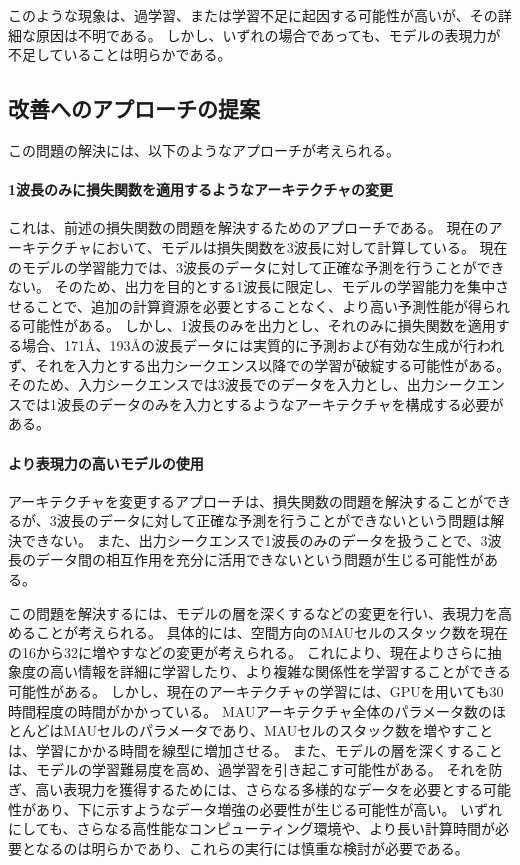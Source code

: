     このような現象は、過学習、または学習不足に起因する可能性が高いが、その詳細な原因は不明である。
    しかし、いずれの場合であっても、モデルの表現力が不足していることは明らかである。
    
    \subsection{改善へのアプローチの提案}
      この問題の解決には、以下のようなアプローチが考えられる。
        \paragraph{1波長のみに損失関数を適用するようなアーキテクチャの変更}
          これは、前述の損失関数の問題を解決するためのアプローチである。
          現在のアーキテクチャにおいて、モデルは損失関数を3波長に対して計算している。
          現在のモデルの学習能力では、3波長のデータに対して正確な予測を行うことができない。
          そのため、出力を目的とする1波長に限定し、モデルの学習能力を集中させることで、追加の計算資源を必要とすることなく、より高い予測性能が得られる可能性がある。
          しかし、1波長のみを出力とし、それのみに損失関数を適用する場合、171Å、193Åの波長データには実質的に予測および有効な生成が行われず、それを入力とする出力シークエンス以降での学習が破綻する可能性がある。
          そのため、入力シークエンスでは3波長でのデータを入力とし、出力シークエンスでは1波長のデータのみを入力とするようなアーキテクチャを構成する必要がある。

        \paragraph{より表現力の高いモデルの使用}
          アーキテクチャを変更するアプローチは、損失関数の問題を解決することができるが、3波長のデータに対して正確な予測を行うことができないという問題は解決できない。
          また、出力シークエンスで1波長のみのデータを扱うことで、3波長のデータ間の相互作用を充分に活用できないという問題が生じる可能性がある。
          
          この問題を解決するには、モデルの層を深くするなどの変更を行い、表現力を高めることが考えられる。
          具体的には、空間方向のMAUセルのスタック数を現在の16から32に増やすなどの変更が考えられる。
          これにより、現在よりさらに抽象度の高い情報を詳細に学習したり、より複雑な関係性を学習することができる可能性がある。
          しかし、現在のアーキテクチャの学習には、GPUを用いても30時間程度の時間がかかっている。
          MAUアーキテクチャ全体のパラメータ数のほとんどはMAUセルのパラメータであり、MAUセルのスタック数を増やすことは、学習にかかる時間を線型に増加させる。
          また、モデルの層を深くすることは、モデルの学習難易度を高め、過学習を引き起こす可能性がある。
          それを防ぎ、高い表現力を獲得するためには、さらなる多様的なデータを必要とする可能性があり、下に示すようなデータ増強の必要性が生じる可能性が高い。
          いずれにしても、さらなる高性能なコンピューティング環境や、より長い計算時間が必要となるのは明らかであり、これらの実行には慎重な検討が必要である。

